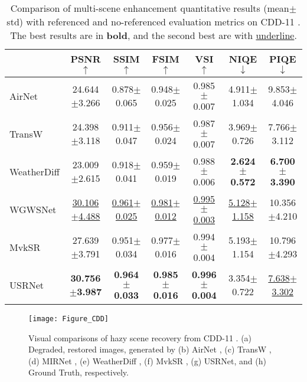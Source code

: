 \documentclass[final,12pt]{elsarticle}
\begin{document}
    \begin{table}[t]
        \centering
        \scriptsize
        \caption{Comparison of multi-scene enhancement quantitative results (mean$\pm$std) with referenced and no-referenced evaluation metrics on CDD-11 \citep{guo2024onerestore}. The best results are in \textbf{bold}, and the second best are with \underline{underline}.}
        \begin{tabular}{l|cccc|cc}
        \hline
        & PSNR $\uparrow$ & SSIM $\uparrow$ & FSIM $\uparrow$ & VSI $\uparrow$ & NIQE $\downarrow$ & PIQE $\downarrow$\\ \hline\hline
        AirNet \citep{li2022all}       & 24.644$\pm$3.266 & 0.878$\pm$0.065 & 0.948$\pm$0.025 & 0.985$\pm$0.007 & 4.911$\pm$1.034 & 9.853$\pm$4.046  \\ 
        TransW \citep{valanarasu2022transweather} & 24.398$\pm$3.118 & 0.911$\pm$0.047 & 0.956$\pm$0.024 & 0.987$\pm$0.007 & 3.969$\pm$0.726 & 7.766$\pm$3.112  \\ 
        WeatherDiff \citep{ozdenizci2023restoring}  & 23.009$\pm$2.615 & 0.918$\pm$0.041 & 0.959$\pm$0.019 & 0.988$\pm$0.006 &\textbf{ 2.624$\pm$0.572} &\textbf{ 6.700$\pm$3.390}  \\ 
        WGWSNet \citep{zhu2023learning}      & \underline{30.106$\pm$4.488} & \underline{0.961$\pm$0.025} & \underline{0.981$\pm$0.012} & \underline{0.995$\pm$0.003} & \underline{5.128$\pm$1.158} & 10.356$\pm$4.210 \\ 
        MvkSR \citep{xu2024mvksr}        &   27.639$\pm$3.791	&0.951$\pm$0.034	&0.977$\pm$0.016	&0.994$\pm$0.004	&5.193$\pm$1.154	&10.796$\pm$4.293  \\ \hline
        USRNet       &\textbf{30.756$\pm$3.987} 	&\textbf{0.964$\pm$0.033}	&\textbf{0.985$\pm$0.016} 	&\textbf{0.996$\pm$0.004} 	&3.354$\pm$0.722	&\underline{7.638$\pm$3.302}                   \\ \hline
        \end{tabular}\label{table:mix}
    \end{table}
    \begin{figure*}[t]
        \centering
        \setlength{\abovecaptionskip}{0.cm}
        \texttt{[image: Figure\_CDD]}
        \caption{Visual comparisons of hazy scene recovery from CDD-11 \citep{guo2024onerestore}. (a) Degraded, restored images, generated by (b) AirNet \citep{li2022all}, (c) TransW \citep{valanarasu2022transweather}, (d) MIRNet \citep{zamir2022learning}, (e) WeatherDiff \citep{ozdenizci2023restoring}, (f) MvkSR \citep{xu2024mvksr}, (g) USRNet, and (h) Ground Truth, respectively.}
        \label{Figure_CDD}
    \end{figure*}
\end{document}
